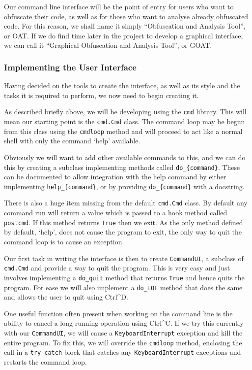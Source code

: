 \documentclass[twoside,a4paper]{report}
\begin{document}
Our command line interface will be the point of entry for users who want to obfuscate their code, as well as for those who want to analyse
already obfuscated code. For this reason, we shall name it simply ``Obfuscation and Analysis Tool'', or OAT. If we do find time later in
the project to develop a graphical interface, we can call it ``Graphical Obfuscation and Analysis Tool'', or GOAT.

\subsubsection{Implementing the User Interface}

Having decided on the tools to create the interface, as well as its style and the tasks it is required to perform, we now need to begin creating it.

As described briefly above, we will be developing using the \texttt{cmd} library. This will mean our starting point is the \texttt{cmd.Cmd} class.
The command loop may be begun from this class using the \texttt{cmdloop} method and will proceed to act like a normal shell with only the
command `help' available.

Obviously we will want to add other available commands to this, and we can do this by creating a subclass implementing methods called
\texttt{do\_\{command\}}. These can be documented to allow integration with the help command by either implementing \texttt{help\_\{command\}}, or by
providing \texttt{do\_\{command\}} with a docstring.

There is also a huge item missing from the default \texttt{cmd.Cmd} class. By default any command run will return a value which is passed to a
hook method called \texttt{postcmd}. If this method returns \texttt{True} then we exit. As the only method defined by default, `help', does not
cause the program to exit, the only way to quit the command loop is to cause an exception.

Our first task in writing the interface is then to create \texttt{CommandUI}, a subclass of \texttt{cmd.Cmd} and provide a way to quit the program.
This is very easy and just involves implementing a \texttt{do\_quit} method that returns \texttt{True} and hence quits the program. For ease we will
also implement a \texttt{do\_EOF} method that does the same and allows the user to quit using Ctrl\^{}D.

One useful function often present when working on the command line is the ability to cancel a long running operation using Ctrl\^{}C. If we try this
currently with our \texttt{CommandUI}, we will cause a \texttt{KeyboardInterrupt} exception and kill the entire program. To fix this, we will
override the \texttt{cmdloop} method, enclosing the call in a \texttt{try-catch} block that catches any \texttt{KeyboardInterrupt} exceptions and
restarts the command loop.
\end{document}
